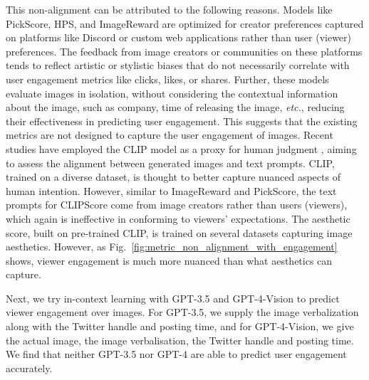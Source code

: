  This non-alignment can be attributed to the following reasons. Models like PickScore, HPS, and ImageReward are optimized for creator preferences captured on platforms like Discord or custom web applications rather than user (viewer) preferences. The feedback from image creators or communities on these platforms tends to reflect artistic or stylistic biases that do not necessarily correlate with user engagement metrics like clicks, likes, or shares. 
 Further, these models evaluate images in isolation, without considering the contextual information about the image, such as company, time of releasing the image, \textit{etc.}, reducing their effectiveness in predicting user engagement. This suggests that the existing metrics are not designed to capture the user engagement of images.
 Recent studies have employed the CLIP model as a proxy for human judgment \cite{nichol2022glide,rombach2022high}, aiming to assess the alignment between generated images and text prompts. CLIP, trained on a diverse dataset, is thought to better capture nuanced aspects of human intention. However, similar to ImageReward and PickScore, the text prompts for CLIPScore come from image creators rather than users (viewers), which again is ineffective in conforming to viewers' expectations. The aesthetic score, built on pre-trained CLIP, is trained on several datasets capturing image aesthetics. However, as Fig.~\ref{fig:metric_non_alignment_with_engagement} shows, viewer engagement is much more nuanced than what aesthetics can capture.


Next, we try in-context learning with GPT-3.5 \cite{ouyang2022training} and GPT-4-Vision \cite{openai2023gpt4} to predict viewer engagement over images. For GPT-3.5, we supply the image verbalization along with the Twitter handle and posting time, and for GPT-4-Vision, we give the actual image, the image verbalisation, the Twitter handle and posting time. We find that neither GPT-3.5 nor GPT-4 are able to predict user engagement accurately. 





